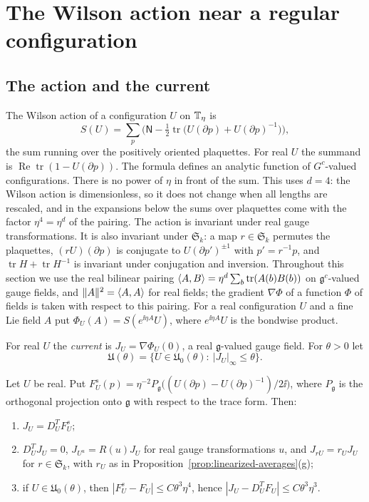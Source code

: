 \section{The Wilson action near a regular configuration}\label{sec:action}

\subsection{The action and the current}\label{ss:23.1}

The Wilson action of a configuration $U$ on $\mathbb T_\eta$ is
\[
S(U)=\sum_p\Big(\mathsf N-\tfrac12\operatorname{tr}\big(U(\partial p)+U(\partial p)^{-1}\big)\Big),
\]
the sum running over the positively oriented plaquettes. For real $U$ the summand is $\operatorname{Re}\operatorname{tr}(1-U(\partial p))$. The formula defines an analytic function of $G^c$-valued configurations. There is no power of $\eta$ in front of the sum. This uses $d=4$: the Wilson action is dimensionless, so it does not change when all lengths are rescaled, and in the expansions below the sums over plaquettes come with the factor $\eta^4=\eta^d$ of the pairing. The action is invariant under real gauge transformations. It is also invariant under $\mathfrak S_k$: a map $r\in\mathfrak S_k$ permutes the plaquettes, $(rU)(\partial p)$ is conjugate to $U(\partial p')^{\pm1}$ with $p'=r^{-1}p$, and $\operatorname{tr}H+\operatorname{tr}H^{-1}$ is invariant under conjugation and inversion. Throughout this section we use the real bilinear pairing $\langle A,B\rangle=\eta^d\sum_b\operatorname{tr}(A(b)B(b))$ on $\mathfrak g^c$-valued gauge fields, and $\|A\|^2=\langle A,A\rangle$ for real fields; the gradient $\nabla\Phi$ of a function $\Phi$ of fields is taken with respect to this pairing. For a real configuration $U$ and a fine Lie field $A$ put $\Phi_U(A)=S(e^{\ii\eta A}U)$, where $e^{\ii\eta A}U$ is the bondwise product.

\begin{definition}\label{def:current}
For real $U$ the \emph{current} is $J_U=\nabla\Phi_U(0)$, a real $\mathfrak g$-valued gauge field. For $\theta>0$ let
\[
\mathfrak U(\theta)=\{U\in\mathfrak U_0(\theta):\ |J_U|_\infty\le\theta\}.
\]
\end{definition}

\begin{lemma}\label{lem:current}
Let $U$ be real. Put $F^s_U(p)=\eta^{-2}P_{\mathfrak g}\big((U(\partial p)-U(\partial p)^{-1})/2\ii\big)$, where $P_{\mathfrak g}$ is the orthogonal projection onto $\mathfrak g$ with respect to the trace form. Then:
\begin{enumerate}[label=(\alph*)]
\item $J_U=D_U^TF^s_U$;
\item $D_U^TJ_U=0$, $J_{U^u}=R(u)J_U$ for real gauge transformations $u$, and $J_{rU}=r_UJ_U$ for $r\in\mathfrak S_k$, with $r_U$ as in Proposition~\ref{prop:linearized-averages}(g);
\item if $U\in\mathfrak U_0(\theta)$, then $|F^s_U-F_U|\le C\theta^3\eta^4$, hence $|J_U-D^T_UF_U|\le C\theta^3\eta^3$.
\end{enumerate}
\end{lemma}

